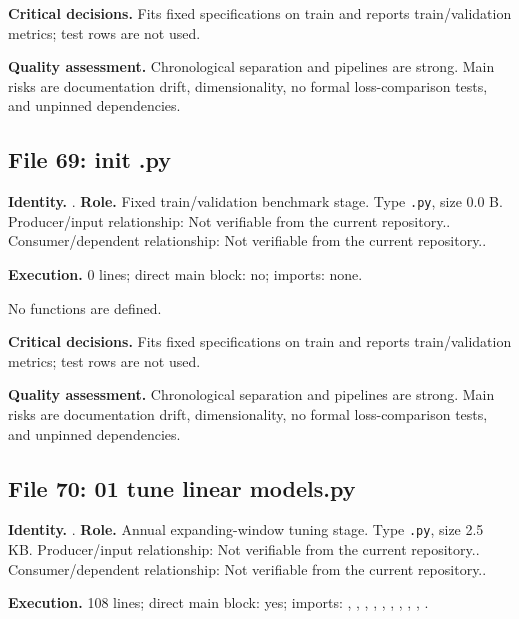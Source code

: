 \documentclass[
  11pt,
  a4paper]{article}
\newcounter{none} %
\begin{document}
\textbf{Critical decisions.} Fits fixed specifications on train and
reports train/validation metrics; test rows are not used.

\textbf{Quality assessment.} Chronological separation and pipelines are
strong. Main risks are documentation drift, dimensionality, no formal
loss-comparison tests, and unpinned dependencies.

\subsection{File 69: init .py}\label{file-8286768690397083854}

\textbf{Identity.} .
\textbf{Role.} Fixed train/validation benchmark stage. Type
\texttt{.py}, size 0.0 B. Producer/input relationship: Not verifiable
from the current repository.. Consumer/dependent relationship: Not
verifiable from the current repository..

\textbf{Execution.} 0 lines; direct main block: no; imports: none.

No functions are defined.

\textbf{Critical decisions.} Fits fixed specifications on train and
reports train/validation metrics; test rows are not used.

\textbf{Quality assessment.} Chronological separation and pipelines are
strong. Main risks are documentation drift, dimensionality, no formal
loss-comparison tests, and unpinned dependencies.

\subsection{File 70: 01 tune linear
models.py}\label{file-4483056719759336330}

\textbf{Identity.}
.
\textbf{Role.} Annual expanding-window tuning stage. Type \texttt{.py},
size 2.5 KB. Producer/input relationship: Not verifiable from the
current repository.. Consumer/dependent relationship: Not verifiable
from the current repository..

\textbf{Execution.} 108 lines; direct main block: yes; imports:
, ,
,
,
,
,
,
,
, .
\end{document}

